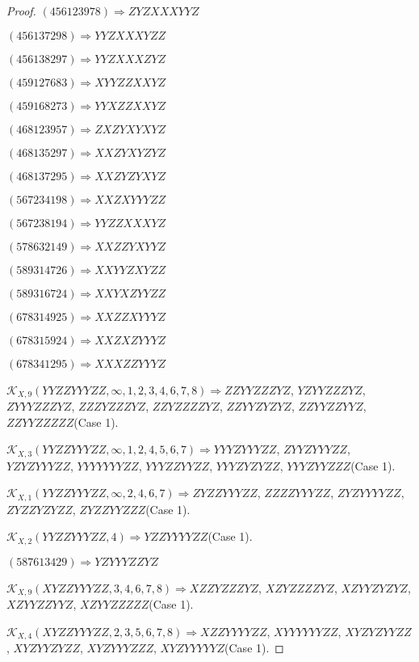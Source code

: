 \documentclass[12pt]{article}
\theoremstyle{plain}
\theoremstyle{definition}
\theoremstyle{remark}
\newcommand{\fancy}[1]{\mathcal{#1}}
\def\K{\fancy{K}}
\begin{document}
\begin{proof}
	$(4 5 6 1 2 3 9 7 8)\Rightarrow ZYZXXXYYZ$
	
	$(4 5 6 1 3 7 2 9 8)\Rightarrow YYZXXXYZZ$
	
	$(4 5 6 1 3 8 2 9 7)\Rightarrow YYZXXXZYZ$
	
	$(4 5 9 1 2 7 6 8 3)\Rightarrow XYYZZXXYZ$
	
	$(4 5 9 1 6 8 2 7 3)\Rightarrow YYXZZXXYZ$
	
	$(4 6 8 1 2 3 9 5 7)\Rightarrow ZXZYXYXYZ$
	
	$(4 6 8 1 3 5 2 9 7)\Rightarrow XXZYXYZYZ$
	
	$(4 6 8 1 3 7 2 9 5)\Rightarrow XXZYZYXYZ$
	
	$(5 6 7 2 3 4 1 9 8)\Rightarrow XXZXYYYZZ$
	
	$(5 6 7 2 3 8 1 9 4)\Rightarrow YYZZXXXYZ$
	
	$(5 7 8 6 3 2 1 4 9)\Rightarrow XXZZYXYYZ$
	
	$(5 8 9 3 1 4 7 2 6)\Rightarrow XXYYZXYZZ$
	
	$(5 8 9 3 1 6 7 2 4)\Rightarrow XXYXZYYZZ$
	
	$(6 7 8 3 1 4 9 2 5)\Rightarrow XXZZXYYYZ$
	
	$(6 7 8 3 1 5 9 2 4)\Rightarrow XXZXZYYYZ$
	
	$(6 7 8 3 4 1 2 9 5)\Rightarrow XXXZZYYYZ$
	
	
	
	$\K_{X,9}(YYZZYYYZZ,\infty,1, 2, 3, 4, 6, 7, 8)\Rightarrow $$ZZYYZZZYZ$, $YZYYZZZYZ$, $ZYYYZZZYZ$, $ZZZYZZZYZ$, $ZZYZZZZYZ$, $ZZYYZYZYZ$, $ZZYYZZYYZ$, $ZZYYZZZZZ$(Case 1).
	
	$\K_{X,3}(YYZZYYYZZ,\infty,1, 2, 4, 5, 6, 7)\Rightarrow $$YYYZYYYZZ$, $ZYYZYYYZZ$, $YZYZYYYZZ$, $YYYYYYYZZ$, $YYYZZYYZZ$, $YYYZYZYZZ$, $YYYZYYZZZ$(Case 1).
	
	$\K_{X,1}(YYZZYYYZZ,\infty,2, 4, 6, 7)\Rightarrow $$ZYZZYYYZZ$, $ZZZZYYYZZ$, $ZYZYYYYZZ$, $ZYZZYZYZZ$, $ZYZZYYZZZ$(Case 1).
	
	$\K_{X,2}(YYZZYYYZZ,4)\Rightarrow $$YZZYYYYZZ$(Case 1).
	
	
	
	$(5 8 7 6 1 3 4 2 9)\Rightarrow YZYYYZZYZ$
	
	
	
	$\K_{X,9}(XYZZYYYZZ,3, 4, 6, 7, 8)\Rightarrow $$XZZYZZZYZ$, $XZYZZZZYZ$, $XZYYZYZYZ$, $XZYYZZYYZ$, $XZYYZZZZZ$(Case 1).
	
	$\K_{X,4}(XYZZYYYZZ,2, 3, 5, 6, 7, 8)\Rightarrow $$XZZYYYYZZ$, $XYYYYYYZZ$, $XYZYZYYZZ$, $XYZYYZYZZ$, $XYZYYYZZZ$, $XYZYYYYYZ$(Case 1).
	

\end{proof}
\end{document}
